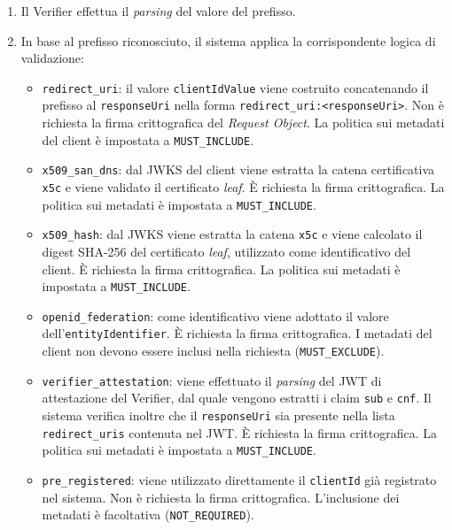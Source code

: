 \begin{enumerate}
    \item Il Verifier effettua il \textit{parsing} del valore del prefisso.
    \item In base al prefisso riconosciuto, il sistema applica la corrispondente logica di validazione:
    \begin{itemize}
        \item \texttt{redirect\_\allowbreak{}uri}: il valore \texttt{clientIdValue} viene costruito concatenando il prefisso al \texttt{responseUri} nella forma \texttt{redirect\_\allowbreak{}uri:<responseUri>}. Non è richiesta la firma crittografica del \textit{Request Object}. La politica sui metadati del client è impostata a \texttt{MUST\_\allowbreak{}INCLUDE}.
        \item \texttt{x509\_\allowbreak{}san\_\allowbreak{}dns}: dal JWKS del client viene estratta la catena certificativa \texttt{x5c} e viene validato il certificato \textit{leaf}. È richiesta la firma crittografica. La politica sui metadati è impostata a \texttt{MUST\_\allowbreak{}INCLUDE}.
        \item \texttt{x509\_\allowbreak{}hash}: dal JWKS viene estratta la catena \texttt{x5c} e viene calcolato il digest SHA-256 del certificato \textit{leaf}, utilizzato come identificativo del client. È richiesta la firma crittografica. La politica sui metadati è impostata a \texttt{MUST\_\allowbreak{}INCLUDE}.
        \item \texttt{openid\_\allowbreak{}federation}: come identificativo viene adottato il valore dell'\texttt{entityIden\-\allowbreak{}tifier}. È richiesta la firma crittografica. I metadati del client non devono essere inclusi nella richiesta (\texttt{MUST\_\allowbreak{}EXCLUDE}).
        \item \texttt{verifier\_\allowbreak{}attestation}: viene effettuato il \textit{parsing} del JWT di attestazione del Verifier, dal quale vengono estratti i claim \texttt{sub} e \texttt{cnf}. Il sistema verifica inoltre che il \texttt{responseUri} sia presente nella lista \texttt{redirect\_\allowbreak{}uris} contenuta nel JWT. È richiesta la firma crittografica. La politica sui metadati è impostata a \texttt{MUST\_\allowbreak{}INCLUDE}.
        \item \texttt{pre\_\allowbreak{}registered}: viene utilizzato direttamente il \texttt{clientId} già registrato nel sistema. Non è richiesta la firma crittografica. L'inclusione dei metadati è facoltativa (\texttt{NOT\_\allowbreak{}REQUIRED}).
    \end{itemize}
\end{enumerate}
